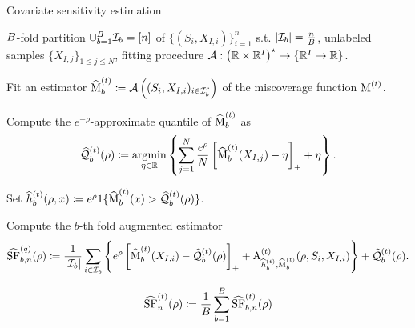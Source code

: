 \begin{algorithm}
  \caption{Covariate sensitivity estimation}
  \label{alg:sensitivity1}
  \begin{algorithmic}
     $B$-fold partition $\cup_{b=1}^B \mathcal{I}_b=[n]$ of $\{(S_i,X_{I,i})\}_{i=1}^n$ s.t. $\left| \mathcal{I}_b \right| =\frac{n}{B}$, unlabeled samples $\{ X_{I, j} \}_{1\le j \le N}$, fitting procedure $\mathcal{A} : \left( \mathbb{R} \times \mathbb{R}^I \right)^\star \to \{ \mathbb{R}^I \to \mathbb{R}\}$.

 \FOR{$\batch \in [\nBatch]$}

  \STATE Fit an estimator
$
  \widehat{\operatorname*{M}}^{(t)}_b \coloneqq \mathcal{A}\left( (S_i,X_{I,i})_{i \in \mathcal{I}_b^c} \right)
$ of the miscoverage function ${\operatorname*{M}}^{(t)}$.

  \STATE Compute the $e^{-\rho}$-approximate quantile of $\widehat{\operatorname*{M}}^{(t)}_b$ as
  \begin{equation}
    \label{eqn:quantile-est-unlabeled}
    \widehat{\mathcal{Q}}_b^{(t)}(\rho) \coloneqq
    \mathop{\rm argmin}_{\eta \in \mathbb{R}} \left\{ \sum_{j = 1}^N
    \frac{e^{\rho}}{N}
    \left[{\widehat{\operatorname*{M}}^{(t)}_b(X_{I,j})-\eta}\right]_+ + \eta \right\}.
  \end{equation}

  \STATE Set $\widehat{h}^{(t)}_b(\rho, x) \coloneqq e^\rho 1\{ \widehat{\operatorname*{M}}^{(t)}_b(x) > \widehat{\mathcal{Q}}_b^{(t)}(\rho)\}$.

    \STATE Compute the $b$-th fold augmented estimator
    \begin{equation}
      \label{eqn:sens-func-aug-estimator}
      \widehat{\operatorname*{SF}}^{(q)}_{b,n}(\rho) \coloneqq  \frac{1}{\left| \mathcal{I}_b \right|} \sum_{i \in \mathcal{I}_b}  \left\{ e^{\rho}
      \left[{\widehat{\operatorname*{M}}^{(t)}_b(X_{I,i})- \widehat{\mathcal{Q}}_b^{(t)}(\rho)}\right]_+ + \textrm{A}^{(t)}_{\widehat{h}^{(t)}_b, \widehat{\operatorname*{M}}^{(t)}_b}(\rho, S_i, X_{I,i})  \right\} +  \widehat{\mathcal{Q}}_b^{(t)}(\rho).
    \end{equation}

   \ENDFOR
   \RETURN
    \begin{align}
    \label{eqn:final-sens-aug-estimator}
    \widehat{\operatorname*{SF}}^{(t)}_n(\rho) \coloneqq \frac{1}{B} \sum_{b=1}^B \widehat{\operatorname*{SF}}^{(t)}_{b,n}(\rho)
    \end{align}

  \end{algorithmic}
\end{algorithm}

